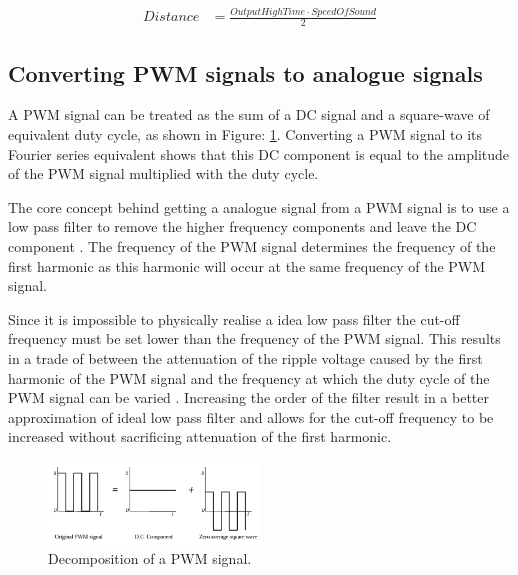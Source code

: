 \begin{align}\label{eqn:sonicsesns_lit_dist}
Distance & = \frac{OutputHighTime \cdot SpeedOfSound}{2}
\end{align}

\newpage
\subsection{Converting PWM signals to analogue signals}
A PWM signal can be treated as the sum of a DC signal and a square-wave of equivalent duty cycle, as shown in Figure: \ref{fig:sonicsen_pwm}. Converting a PWM signal to its Fourier series equivalent shows that this DC component is equal to the amplitude of the PWM signal multiplied with the duty cycle\cite{Design_SonicSens_Filter}.

The core concept behind getting a analogue signal from a PWM signal is to use a low pass filter to remove the higher frequency components and leave the DC component \cite{Design_SonicSens_Filter}. The frequency of the PWM signal determines the frequency of the first harmonic as this harmonic will occur at the same frequency of the PWM signal.

Since it is impossible to physically realise a idea low pass filter the cut-off frequency must be set lower than the frequency of the PWM signal. This results in a trade of between the attenuation of the ripple voltage caused by the first harmonic of the PWM signal and the frequency at which the duty cycle of the PWM signal can be varied \cite{Design_SonicSens_Filter}. Increasing the order of the filter result in a better approximation of ideal low pass filter and allows for the cut-off frequency to be increased without sacrificing attenuation of the first harmonic.

\begin{figure}[H]
\centering
\includegraphics[width=0.5\textwidth]{./Figures/SonicSens_PWM.png}
\caption{Decomposition of a PWM signal\cite{Design_SonicSens_Filter}.}
\label{fig:sonicsen_pwm}	
\end{figure}

\newpage

